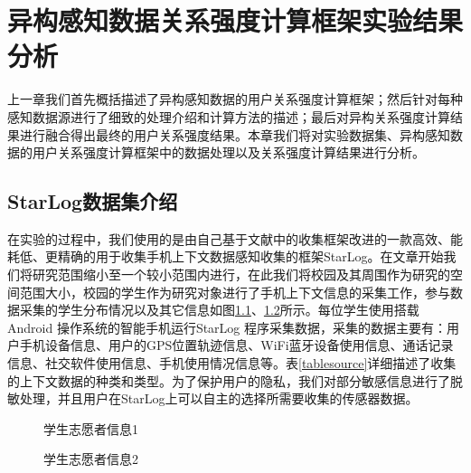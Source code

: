 \chapter{异构感知数据关系强度计算框架实验结果分析}
\label{chap:chapter03}
上一章我们首先概括描述了异构感知数据的用户关系强度计算框架；然后针对每种感知数据源进行了细致的处理介绍和计算方法的描述；最后对异构关系强度计算结果进行融合得出最终的用户关系强度结果。本章我们将对实验数据集、异构感知数据的用户关系强度计算框架中的数据处理以及关系强度计算结果进行分析。

\section{StarLog数据集介绍}
\label{sec:section5-1}
在实验的过程中，我们使用的是由自己基于文献\cite{rawassizadeh2013ubiqlog}中的收集框架改进的一款高效、能耗低、更精确的用于收集手机上下文数据感知收集的框架StarLog。在文章开始我们将研究范围缩小至一个较小范围内进行，在此我们将校园及其周围作为研究的空间范围大小，校园的学生作为研究对象进行了手机上下文信息的采集工作，参与数据采集的学生分布情况以及其它信息如图\ref{fig:stu_info1}、\ref{fig:stu_info2}所示。每位学生使用搭载Android 操作系统的智能手机运行StarLog 程序采集数据，采集的数据主要有：用户手机设备信息、用户的GPS位置轨迹信息、WiFi蓝牙设备使用信息、通话记录信息、社交软件使用信息、手机使用情况信息等。表\ref{tablesource}详细描述了收集的上下文数据的种类和类型。为了保护用户的隐私，我们对部分敏感信息进行了脱敏处理，并且用户在StarLog上可以自主的选择所需要收集的传感器数据。
\begin{figure}[htb]
  \centering%
  \hspace{4em}%
  \caption{学生志愿者信息1}
  \label{fig:stu_info1}
\end{figure}

\begin{figure}[htb]
  \centering%
  \hspace{4em}%
  \caption{学生志愿者信息2}
  \label{fig:stu_info2}
\end{figure}


